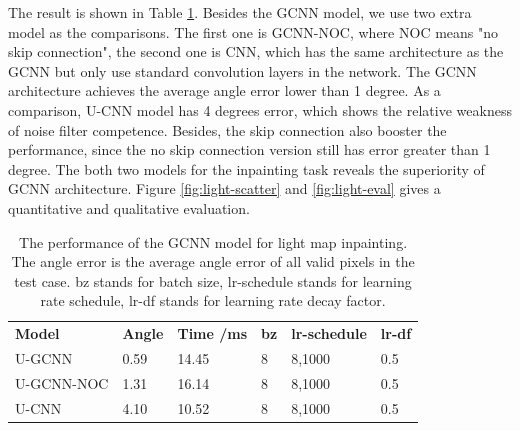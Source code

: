 \documentclass[border=15pt, multi, tikz]{article}
\newcommand{\tabhead}[1]{\textbf{#1}}
\begin{document}
The result is shown in Table \ref{tab:light-inpainting}. Besides the GCNN model, we use two extra model as the comparisons. The first one is GCNN-NOC, where NOC means "no skip connection", the second one is CNN, which has the same architecture as the GCNN but only use standard convolution layers in the network.
The GCNN architecture achieves the average angle error lower than 1 degree. As a comparison, U-CNN model has 4 degrees error, which shows the relative weakness of noise filter competence. Besides, the skip connection also booster the performance, since the no skip connection version still has error greater than 1 degree. The both two models for the inpainting task reveals the superiority of GCNN architecture. Figure \ref{fig:light-scatter} and \ref{fig:light-eval} gives a quantitative and qualitative evaluation.

\begin{table}[H]
	
	\centering
	\begin{tabular}{l l l l l l }
		\tabhead{Model} & \tabhead{Angle} & \tabhead{Time /ms} & \tabhead{bz} & \tabhead{lr-schedule} & \tabhead{lr-df}\\
		U-GCNN  & 0.59  & 14.45 & 8 & 8,1000 & 0.5\\ 
		\hline
		U-GCNN-NOC & 1.31 & 16.14 & 8 & 8,1000 & 0.5\\
		\hline
		U-CNN & 4.10 & 10.52 & 8 & 8,1000 & 0.5\\
	\end{tabular}
	\caption{The performance of the GCNN model for light map inpainting. The angle error is the average angle error of all valid pixels in the test case. bz stands for batch size, lr-schedule stands for learning rate schedule, lr-df stands for learning rate decay factor.}	
	\label{tab:light-inpainting}
\end{table}
\end{document}
